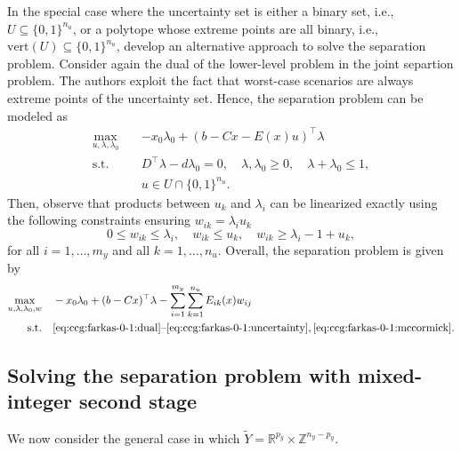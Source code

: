 In the special case where the uncertainty set is either a binary set, i.e., $U
\subseteq \{0,1\}^{n_u}$, or a polytope whose extreme points are all binary,
i.e., $\text{vert}(U) \subseteq \{0,1\}^{n_u}$, \textcite{Ayoub2016} develop
an alternative approach to solve the separation problem. Consider again the
dual of the lower-level problem in the joint separtion problem. The authors
exploit the fact that worst-case scenarios are always extreme points of the
uncertainty set. Hence, the separation problem can be modeled as
\begin{subequations}
    \begin{align}
        \max_{u,\lambda,\lambda_0} \quad & -x_0\lambda_0 + (b - Cx - E(x)u)^\top \lambda \\
        \text{s.t.} \quad & D^\top \lambda - d\lambda_0 = 0, \quad \lambda, \lambda_0 \ge 0, \quad \lambda + \lambda_0 \le 1, \label{eq:ccg:farkas-0-1:dual} \\
        & u\in U\cap\{0,1\}^{n_u} \label{eq:ccg:farkas-0-1:uncertainty}.
    \end{align}
\end{subequations}
Then, observe that products between $u_k$ and $\lambda_i$ can be linearized
exactly using the following constraints ensuring $w_{ik} = \lambda_iu_k$
\begin{equation}
    0 \le w_{ik} \le \lambda_i, \quad 
    w_{ik} \le u_k, \quad 
    w_{ik} \ge \lambda_i - 1 + u_k,
    \label{eq:ccg:farkas-0-1:mccormick}
\end{equation}
for all $i=1,\dotsc,m_y$ and all $k = 1,\dotsc,n_u$. Overall, the separation
problem is given by 
\begin{subequations}
    \begin{align*}
        \max_{u,\lambda,\lambda_0,w} \quad & -x_0\lambda_0 + (b - Cx)^\top \lambda - \sum_{i=1}^{m_y} \sum_{k=1}^{n_u} E_{ik}(x)w_{ij} \\
        \text{s.t.} \quad & \text{\eqref{eq:ccg:farkas-0-1:dual}--\eqref{eq:ccg:farkas-0-1:uncertainty}}, \eqref{eq:ccg:farkas-0-1:mccormick}. 
    \end{align*}
\end{subequations}

\subsection{Solving the separation problem with mixed-integer second stage}

We now consider the general case in which $\tilde{Y} =
\mathbb{R}^{p_y}\times\mathbb{Z}^{n_y - p_y}$. 

